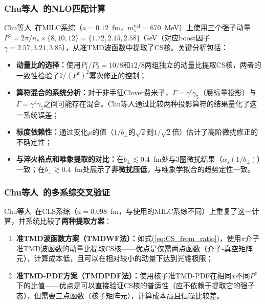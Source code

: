 \documentclass[12pt,a4paper]{ctexart}
\theoremstyle{definition}
\begin{document}
\subsubsection{Chu等人~\cite{Chu2022CSkernel}的NLO匹配计算}

Chu等人~\cite{Chu2022CSkernel}在MILC系综（$a = 0.12$~fm，$m_\pi^{\text{val}} = 670$~MeV）上使用三个强子动量$P^z = 2\pi/n_s \times \{8, 10, 12\} = \{1.72, 2.15, 2.58\}$~GeV（对应boost因子$\gamma = 2.57, 3.21, 3.85$），从准TMD波函数中提取了CS核。关键分析包括：

\begin{itemize}
    \item \textbf{动量比的选择：}使用$P^z_1/P^z_2 = 10/8$和$12/8$两组独立的动量比提取CS核，两者的一致性检验了$1/(P^z)^2$幂次修正的控制；
    \item \textbf{算符混合的系统分析：}对于非手征Clover费米子，$\Gamma = \gamma^t\gamma_5$（赝标量投影）与$\Gamma = \gamma^z\gamma_5$之间可能存在混合。Chu等人通过比较两种投影算符的结果量化了这一系统误差；
    \item \textbf{标度依赖性：}通过变化$\mu$的值（$1/b_\perp$的$\sqrt{2}$到$1/\sqrt{2}$倍）估计了高阶微扰修正的不确定性；
    \item \textbf{与淬火格点和唯象提取的对比：}在$b_\perp \lesssim 0.4$~fm处与3圈微扰结果（$\alpha_s(1/b_\perp)$）一致；在$b_\perp \gtrsim 0.4$~fm处展示了\textbf{非微扰压低}，与唯象学拟合的趋势定性一致。
\end{itemize}

\subsubsection{Chu等人~\cite{Chu2023soft}的多系综交叉验证}

Chu等人~\cite{Chu2023soft}在CLS系综（$a = 0.098$~fm，与\cite{Chu2022CSkernel}使用的MILC系综不同）上重复了这一计算，并系统比较了\textbf{两种提取方案}：

\begin{enumerate}
    \item \textbf{准TMD波函数方案（TMDWF法）：}如式(\ref{eq:CS_from_ratio})，使用$\pi$介子准TMD波函数的动量比提取CS核——优点是仅需两点函数（介子-真空矩阵元），计算成本低，且可以在相对较小的动量下达到光锥极限；
    \item \textbf{准TMD-PDF方案（TMDPDF法）：}使用核子准TMD-PDF在相同$x$不同$P^z$下的比值——优点是可以直接验证CS核的普适性（应不依赖于提取它的强子态），但需要三点函数（核子矩阵元），计算成本高且信噪比较差。
\end{enumerate}
\end{document}

